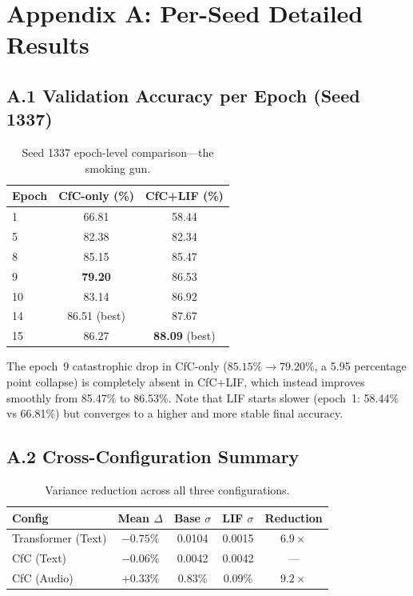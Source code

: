 \documentclass[11pt]{article}
\begin{document}
\clearpage
\appendix

\section*{Appendix A: Per-Seed Detailed Results}

\subsection*{A.1 Validation Accuracy per Epoch (Seed 1337)}

\begin{table}[h]
\centering
\caption{Seed 1337 epoch-level comparison---the smoking gun.}
\label{tab:seed1337}
\begin{tabular}{lcc}
\toprule
\textbf{Epoch} & \textbf{CfC-only (\%)} & \textbf{CfC+LIF (\%)} \\
\midrule
1 & 66.81 & 58.44 \\
5 & 82.38 & 82.34 \\
8 & 85.15 & 85.47 \\
9 & \textbf{79.20} & 86.53 \\
10 & 83.14 & 86.92 \\
14 & 86.51 (best) & 87.67 \\
15 & 86.27 & \textbf{88.09} (best) \\
\bottomrule
\end{tabular}
\end{table}

The epoch~9 catastrophic drop in CfC-only ($85.15\% \to 79.20\%$, a 5.95 percentage point collapse) is completely absent in CfC+LIF, which instead improves smoothly from 85.47\% to 86.53\%. Note that LIF starts slower (epoch~1: 58.44\% vs 66.81\%) but converges to a higher and more stable final accuracy.

\subsection*{A.2 Cross-Configuration Summary}

\begin{table}[h]
\centering
\caption{Variance reduction across all three configurations.}
\label{tab:cross-config}
\begin{tabular}{lcccc}
\toprule
\textbf{Config} & \textbf{Mean $\Delta$} & \textbf{Base $\sigma$} & \textbf{LIF $\sigma$} & \textbf{Reduction} \\
\midrule
Transformer (Text) & $-0.75\%$ & 0.0104 & 0.0015 & $6.9\times$ \\
CfC (Text) & $-0.06\%$ & 0.0042 & 0.0042 & --- \\
CfC (Audio) & $+0.33\%$ & 0.83\% & 0.09\% & $9.2\times$ \\
\bottomrule
\end{tabular}
\end{table}
\end{document}
